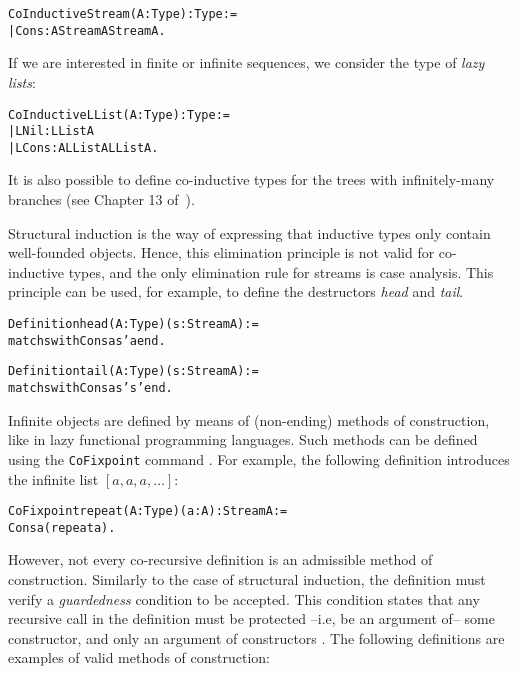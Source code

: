 \documentclass[11pt]{article}
\newcommand{\refmancite}[1]{{}}
\begin{document}
\begin{alltt}
 CoInductive Stream (A: Type) :Type   := 
 | Cons : A\arrow{}Stream A\arrow{}Stream A.
\end{alltt}

If we are interested in finite or infinite sequences, we consider the type
of \emph{lazy lists}:

\begin{alltt}
CoInductive LList (A: Type) : Type :=
 |  LNil : LList A
 |  LCons : A {\arrow} LList A {\arrow} LList A.
\end{alltt}


It is also possible to define  co-inductive types for the 
trees with infinitely-many branches (see Chapter 13 of~\cite{coqart}).

Structural induction is the way of expressing that inductive types
only contain well-founded objects. Hence, this elimination principle
is not valid for co-inductive types, and the only elimination rule for
streams is case analysis.  This principle can be used, for example, to
define the destructors \textsl{head} and \textsl{tail}.

\begin{alltt}
 Definition head (A:Type)(s : Stream A) := 
   match s with Cons a s' {\funarrow} a end.

 Definition tail (A : Type)(s : Stream A) :=
      match s with Cons a s' {\funarrow} s' end.
\end{alltt}

Infinite objects are defined by means of (non-ending) methods of
construction, like in lazy functional programming languages.  Such
methods can be defined using the \texttt{CoFixpoint} command
\refmancite{Section \ref{CoFixpoint}}. For example, the following
definition introduces the infinite list $[a,a,a,\ldots]$:

\begin{alltt}
 CoFixpoint repeat (A:Type)(a:A) : Stream A := 
   Cons a (repeat a).
\end{alltt}


However, not every co-recursive definition is an admissible method of
construction. Similarly to the case of structural induction, the
definition must verify a \textsl{guardedness} condition to be
accepted. This condition states that any recursive call in the
definition must be protected --i.e, be an argument of-- some
constructor, and only an argument of constructors \cite{EG94a}. The
following definitions are examples of valid methods of construction:
\end{document}
